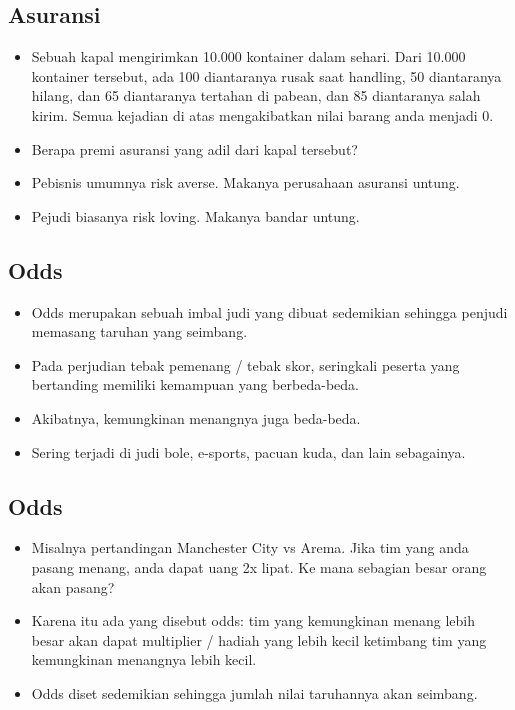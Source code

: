 \documentclass[
  letterpaper,
  DIV=11,
  numbers=noendperiod]{scrartcl}
\begin{document}
\subsection{Asuransi}\label{asuransi-2}

\begin{itemize}
\item
  Sebuah kapal mengirimkan 10.000 kontainer dalam sehari. Dari 10.000
  kontainer tersebut, ada 100 diantaranya rusak saat handling, 50
  diantaranya hilang, dan 65 diantaranya tertahan di pabean, dan 85
  diantaranya salah kirim. Semua kejadian di atas mengakibatkan nilai
  barang anda menjadi 0.
\item
  Berapa premi asuransi yang adil dari kapal tersebut?
\item
  Pebisnis umumnya risk averse. Makanya perusahaan asuransi untung.
\item
  Pejudi biasanya risk loving. Makanya bandar untung.
\end{itemize}

\subsection{Odds}\label{odds}

\begin{itemize}
\item
  Odds merupakan sebuah imbal judi yang dibuat sedemikian sehingga
  penjudi memasang taruhan yang seimbang.
\item
  Pada perjudian tebak pemenang / tebak skor, seringkali peserta yang
  bertanding memiliki kemampuan yang berbeda-beda.
\item
  Akibatnya, kemungkinan menangnya juga beda-beda.
\item
  Sering terjadi di judi bole, e-sports, pacuan kuda, dan lain
  sebagainya.
\end{itemize}

\subsection{Odds}\label{odds-1}

\begin{itemize}
\item
  Misalnya pertandingan Manchester City vs Arema. Jika tim yang anda
  pasang menang, anda dapat uang 2x lipat. Ke mana sebagian besar orang
  akan pasang?
\item
  Karena itu ada yang disebut odds: tim yang kemungkinan menang lebih
  besar akan dapat multiplier / hadiah yang lebih kecil ketimbang tim
  yang kemungkinan menangnya lebih kecil.
\item
  Odds diset sedemikian sehingga jumlah nilai taruhannya akan seimbang.
\end{itemize}
\end{document}
